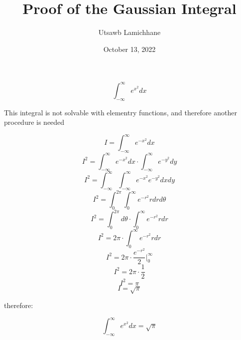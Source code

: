 \documentclass[12pt, letterpaper]{article}
\title{Proof of the Gaussian Integral}
\author{Utsawb Lamichhane}
\date{October 13, 2022}
\begin{document}
    \maketitle
    \[ \int_{-\infty}^{\infty} {e^{x^2}} {dx} \]

    This integral is not solvable with elementry functions,
    and therefore another procedure is needed

    \[ I = \int_{-\infty}^{\infty} {e^{-x^2}} {dx} \]
    \[ I^2 = \int_{-\infty}^{\infty} {e^{-x^2}} {dx} \cdot \int_{-\infty}^{\infty} {e^{-y^2}} {dy} \]
    \[ I^2 = \int_{-\infty}^{\infty} \int_{-\infty}^{\infty} {e^{-x^2}} {e^{-y^2}} {dx}{dy} \]
    \[ I^2 = \int_{0}^{2\pi} \int_0^\infty {e^{-r^2}}r{dr}{d\theta} \]
    \[ I^2 = \int_{0}^{2\pi} {d\theta} \cdot \int_{0}^{\infty} {e^{-r^2}} r{dr} \]
    \[ I^2 = {2\pi} \cdot \int_{0}^{\infty} {e^{-r^2}} r{dr} \]
    \[ I^2 = {2\pi} \cdot \left. \frac{e^{-r^2}}{2} \bigg|_{0}^{\infty} \right. \]
    \[ I^2 = {2\pi} \cdot \frac{1}{2} \]
    \[ I^2 = \pi \]
    \[ I = \sqrt{\pi} \]

    therefore:

    \[ \int_{-\infty}^{\infty} {e^{x^2}} {dx} = \sqrt{\pi}\]
    
\end{document}
